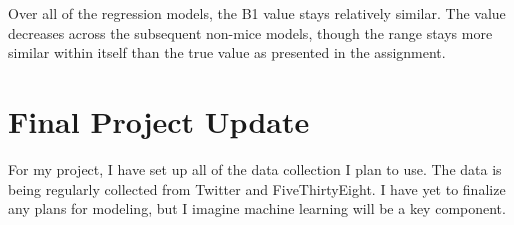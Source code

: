 \documentclass{article}
\begin{document}
Over all of the regression models, the B1 value stays relatively similar. The value decreases across the subsequent non-mice models, though the range stays more similar within itself than the true value as presented in the assignment.

\section{Final Project Update}
For my project, I have set up all of the data collection I plan to use. The data is being regularly collected from Twitter and FiveThirtyEight. I have yet to finalize any plans for modeling, but I imagine machine learning will be a key component. 
\end{document}
